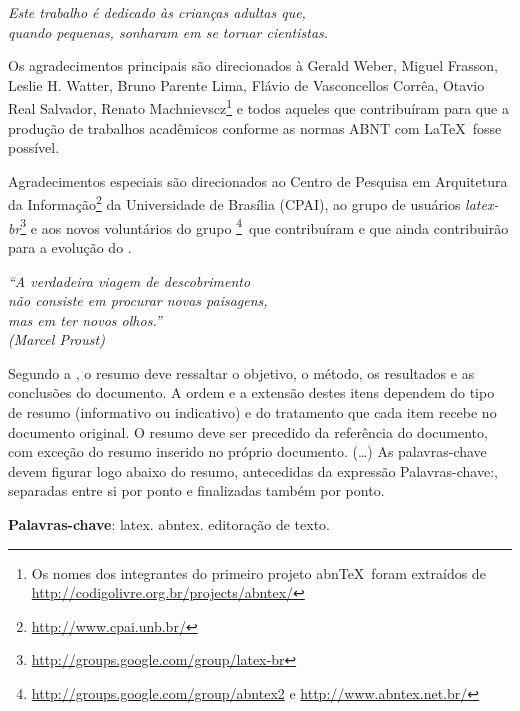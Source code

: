 \documentclass[
	12pt,				%
	openright,			%
	oneside,			%
	a4paper,			%
	chapter=TITLE,		%
	english,			%
	french,				%
	spanish,			%
	brazil				%
	]{abntex2}
\theoremstyle{definition}
\begin{document}
\begin{dedicatoria}
   \vspace*{\fill}
   \centering
   \noindent
   \textit{Este trabalho é dedicado às crianças adultas que,\\
   quando pequenas, sonharam em se tornar cientistas.} \vspace*{\fill}
\end{dedicatoria}

\begin{agradecimentos}
Os agradecimentos principais são direcionados à Gerald Weber, Miguel Frasson,
Leslie H. Watter, Bruno Parente Lima, Flávio de Vasconcellos Corrêa, Otavio Real
Salvador, Renato Machnievscz\footnote{Os nomes dos integrantes do primeiro
projeto abn\TeX\ foram extraídos de
\url{http://codigolivre.org.br/projects/abntex/}} e todos aqueles que
contribuíram para que a produção de trabalhos acadêmicos conforme
as normas ABNT com \LaTeX\ fosse possível.

Agradecimentos especiais são direcionados ao Centro de Pesquisa em Arquitetura
da Informação\footnote{\url{http://www.cpai.unb.br/}} da Universidade de
Brasília (CPAI), ao grupo de usuários
\emph{latex-br}\footnote{\url{http://groups.google.com/group/latex-br}} e aos
novos voluntários do grupo
\emph{\abnTeX}\footnote{\url{http://groups.google.com/group/abntex2} e
\url{http://www.abntex.net.br/}}~que contribuíram e que ainda
contribuirão para a evolução do \abnTeX.

\end{agradecimentos}

\begin{epigrafe}
    \vspace*{\fill}
	\begin{flushright}
		\textit{``A verdadeira viagem de descobrimento 
        \\não consiste em procurar novas paisagens,
        \\mas em ter novos olhos.''\\
		(Marcel Proust)}
	\end{flushright}
\end{epigrafe}


\setlength{\absparsep}{18pt} %
\begin{resumo}
Segundo a , o resumo deve ressaltar o
 objetivo, o método, os resultados e as conclusões do documento. A ordem e a extensão destes itens dependem do tipo de resumo (informativo ou indicativo) e do tratamento que cada item recebe no documento original. O resumo deve ser precedido da referência do documento, com exceção do resumo inserido no próprio documento. (\ldots) As palavras-chave devem figurar logo abaixo do resumo, antecedidas da expressão Palavras-chave:, separadas entre si por ponto e finalizadas também por ponto.

 \textbf{Palavras-chave}: latex. abntex. editoração de texto.
\end{resumo}
\end{document}
